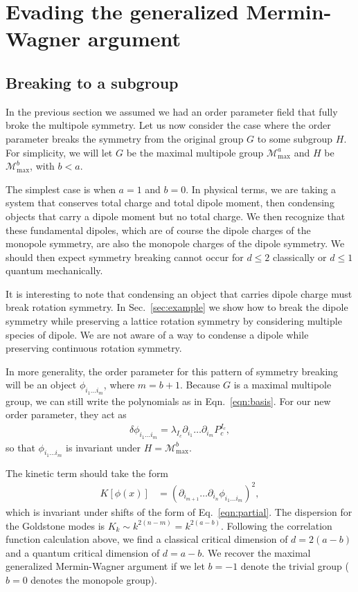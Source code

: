 \documentclass[twocolumn, longbibliography]{revtex4-2}
\renewcommand{\max}{\text{max}}
\begin{document}
\section{Evading the generalized Mermin-Wagner argument} \label{sec:evade}

\subsection{Breaking to a subgroup} \label{sub:subgroup}

In the previous section we assumed we had an order parameter field that fully broke the multipole symmetry. Let us now consider the case where the order parameter breaks the symmetry from the original group $G$ to some subgroup $H$. For simplicity, we will let $G$ be the maximal multipole group $\mathcal{M}^{a}_\text{max}$ and $H$ be $\mathcal{M}^b_\text{max}$, with $b<a$. 

The simplest case is when $a=1$ and $b=0$. In physical terms, we are taking a system that conserves total charge and total dipole moment, then condensing objects that carry a dipole moment but no total charge. We then recognize that these fundamental dipoles, which are of course the dipole charges of the monopole symmetry, are also the monopole charges of the dipole symmetry.  We should then expect symmetry breaking cannot occur for $d\le 2$ classically or $d\le 1$ quantum mechanically.

It is interesting to note that condensing an object that carries dipole charge must break rotation symmetry. In Sec.~\ref{sec:example} we show how to break the dipole symmetry while preserving a lattice rotation symmetry by considering multiple species of dipole. We are not aware of a way to condense a dipole while preserving continuous rotation symmetry.

In more generality, the order parameter for this pattern of symmetry breaking will be an object $\phi_{i_1\dots i_m}$, where $m=b+1$. Because $G$ is a maximal multipole group, we can still write the polynomials as in Eqn.~\ref{eqn:basis}. For our new order parameter, they act as
\begin{align}
\delta \phi_{i_1 \dots i_m} = \lambda_{I_c} \partial_{i_1} \dots \partial_{i_m} P_c^{I_c}, \label{eqn:partial}
\end{align}
so that $\phi_{i_1 \dots i_m}$ is invariant under $H=\mathcal{M}^b_\max$. 

The kinetic term should take the form
\begin{align}
K[\phi(x)] &= (\partial_{i_{m+1}}\dots \partial_{i_n} \phi_{i_1 \dots i_m})^2,
\end{align}
which is invariant under shifts of the form of Eq.~\ref{eqn:partial}. The dispersion for the Goldstone modes is $K_k \sim k^{2(n-m)} = k^{2(a-b)}$. Following the correlation function calculation above, we find a classical critical dimension of $d = 2(a-b)$ and a quantum critical dimension of $d = a-b$. We recover the maximal generalized Mermin-Wagner argument if we let $b=-1$ denote the trivial group ($b=0$ denotes the monopole group).
\end{document}
